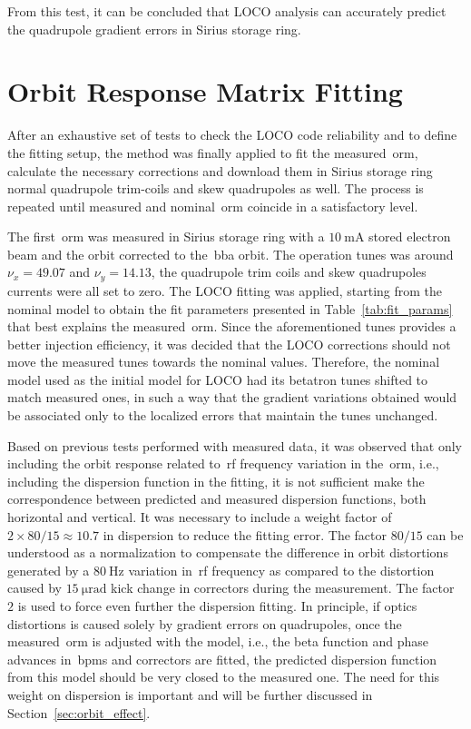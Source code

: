 From this test, it can be concluded that LOCO analysis can accurately predict the quadrupole gradient errors in Sirius storage ring. 

\section{Orbit Response Matrix Fitting}\label{sec:orm_fit}
After an exhaustive set of tests to check the LOCO code reliability and to define the fitting setup, the method was finally applied to fit the measured~\gls{orm}, calculate the necessary corrections and download them in Sirius storage ring normal quadrupole trim-coils and skew quadrupoles as well. The process is repeated until measured and nominal~\gls{orm} coincide in a satisfactory level.

The first~\gls{orm} was measured in Sirius storage ring with a $\SI{10}{\milli\ampere}$ stored electron beam and the orbit corrected to the~\gls{bba} orbit. The operation tunes was around $\nu_x = 49.07$ and $\nu_y = 14.13$, the quadrupole trim coils and skew quadrupoles currents were all set to zero. The LOCO fitting was applied, starting from the nominal model to obtain the fit parameters presented in Table~\ref{tab:fit_params} that best explains the measured~\gls{orm}. Since the aforementioned tunes provides a better injection efficiency, it was decided that the LOCO corrections should not move the measured tunes towards the nominal values. Therefore, the nominal model used as the initial model for LOCO had its betatron tunes shifted to match measured ones, in such a way that the gradient variations obtained would be associated only to the localized errors that maintain the tunes unchanged.

Based on previous tests performed with measured data, it was observed that only including the orbit response related to~\gls{rf} frequency variation in the~\gls{orm}, i.e., including the dispersion function in the fitting, it is not sufficient make the correspondence between predicted and measured dispersion functions, both horizontal and vertical. It was necessary to include a weight factor of $2 \times 80/15 \approx 10.7$ in dispersion to reduce the fitting error. The factor $80/15$ can be understood as a normalization to compensate the difference in orbit distortions generated by a $\SI{80}{\hertz}$ variation in~\gls{rf} frequency as compared to the distortion caused by $\SI{15}{\micro\radian}$ kick change in correctors during the measurement. The factor $2$ is used to force even further the dispersion fitting. In principle, if optics distortions is caused solely by gradient errors on quadrupoles, once the measured~\gls{orm} is adjusted with the model, i.e., the beta function and phase advances in~\glspl{bpm} and correctors are fitted, the predicted dispersion function from this model should be very closed to the measured one. The need for this weight on dispersion is important and will be further discussed in Section~\ref{sec:orbit_effect}.

